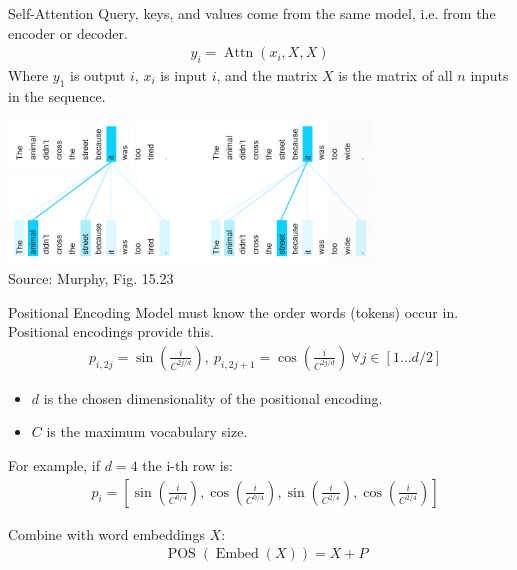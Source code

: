 \documentclass[ignorenonframetext,xcolor=x11names]{beamer}
\begin{document}
\begin{frame}{Self-Attention}
Query, keys, and values come from the same model, i.e. from the encoder or decoder.
\begin{align*}
y_i = \operatorname{Attn}(x_i, X, X)
\end{align*}
Where $y_1$ is output $i$, $x_i$ is input $i$, and the matrix $X$ is the matrix of all $n$ inputs in the sequence. 

\begin{center}
\includegraphics[height=1.5in]{murphy_15_23.png} \\

\scriptsize Source: Murphy, Fig. 15.23 \normalsize
\end{center}
\end{frame}

\begin{frame}{Positional Encoding}
Model must know the order words (tokens) occur in. Positional encodings provide this. 
\begin{align*}
&p_{i, 2j} = \sin \left( \frac{i}{C^{2j/d}} \right), \ p_{i, 2j+1} = \cos \left( \frac{i}{C^{2j/d}} \right) \ \forall j \in [1 \ldots d/2]
\end{align*}
\begin{itemize}
\item $d$ is the chosen dimensionality of the positional encoding.
\item $C$ is the maximum vocabulary size.
\end{itemize}

For example, if $d=4$ the i-th row is:
\begin{align*}
&p_i = [ \sin(\frac{i}{C^{0/4}}), \cos(\frac{i}{C^{0/4}}), \sin(\frac{i}{C^{2/4}}), \cos(\frac{i}{C^{2/4}}) ]
\end{align*}

Combine with word embeddings $X$:
\begin{align*}
&\operatorname{POS}(\operatorname{Embed}(X)) = X + P
\end{align*}
\end{frame}
\end{document}
